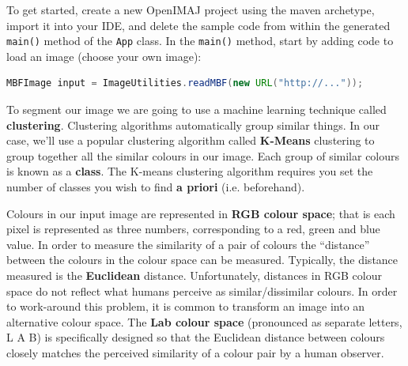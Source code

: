 \documentclass[10pt,a4paper,twoside,extrafontsizes]{memoir}
\begin{document}
To get started, create a new OpenIMAJ project using the maven archetype, 
import it into your IDE, and delete the sample code from within the generated 
\verb+main()+ method of the \verb+App+ class. In the \verb+main()+ method, 
start by adding code to load an image (choose your own image):
\begin{lstlisting}[language=java]
MBFImage input = ImageUtilities.readMBF(new URL("http://..."));
\end{lstlisting}

To segment our image we are going to use a machine 
learning technique called 
\textbf{clustering}. Clustering algorithms automatically group similar things. In our 
case, we'll use a popular clustering algorithm called \textbf{K-Means} clustering to group 
together all the similar colours in our image. Each group of similar colours is 
known as a \textbf{class}. The K-means clustering algorithm requires you set the number 
of classes you wish to find \textbf{a priori} (i.e. beforehand). 

Colours in our input image are represented in \textbf{RGB colour space}; that is each pixel is 
represented as three numbers, corresponding to a red, green and blue value. In order 
to measure the similarity of a pair of colours the ``distance'' between the colours in 
the colour space can be measured.  Typically, the distance measured is the \textbf{Euclidean} 
distance. Unfortunately, distances in RGB colour space do not reflect what humans perceive as 
similar/dissimilar colours. In order to work-around this problem, it is common to transform 
an image into an alternative colour space. The \textbf{Lab colour space} (pronounced as 
separate letters, L A B) is specifically designed so that the Euclidean distance between 
colours closely matches the perceived similarity of a colour pair by a human observer.
\end{document}
